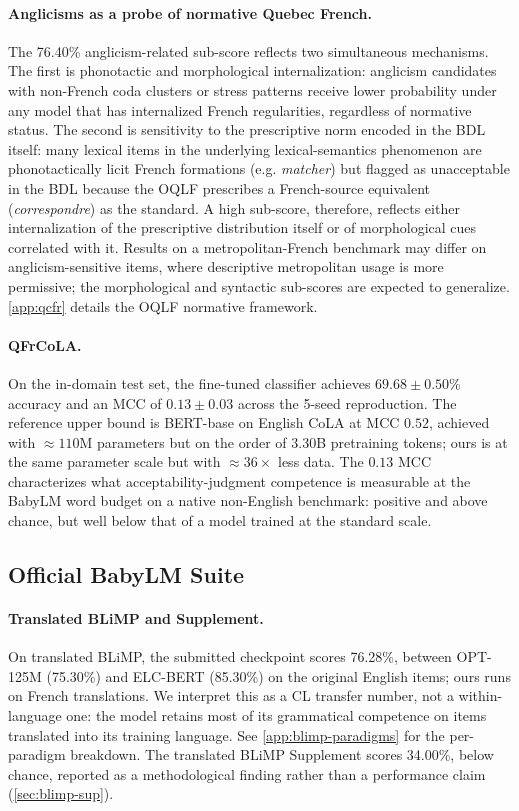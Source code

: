 \documentclass[11pt]{article}
\begin{document}
\paragraph{Anglicisms as a probe of normative Quebec French.}
The 76.40\% anglicism-related sub-score reflects two simultaneous mechanisms. The first is phonotactic and morphological internalization: anglicism candidates with non-French coda clusters or stress patterns receive lower probability under any model that has internalized French regularities, regardless of normative status. 
The second is sensitivity to the prescriptive norm encoded in the BDL itself: many lexical items in the underlying lexical-semantics phenomenon are phonotactically licit French formations (e.g. \emph{matcher}) but flagged as unacceptable in the BDL because the OQLF prescribes a French-source equivalent (\emph{correspondre}) as the standard. A high sub-score, therefore, reflects either internalization of the prescriptive distribution itself or of morphological cues correlated with it. Results on a metropolitan-French benchmark may differ on anglicism-sensitive items, where descriptive metropolitan usage is more permissive; the morphological and syntactic sub-scores are expected to generalize. \autoref{app:qcfr} details the OQLF normative framework.

\paragraph{QFrCoLA.}
On the in-domain test set, the fine-tuned classifier achieves $69.68 \pm 0.50$\% accuracy and an MCC of $0.13 \pm 0.03$ across the 5-seed reproduction. The reference upper bound is BERT-base on English CoLA at MCC $0.52$, achieved with $\approx\!110$M parameters but on the order of 3.30B pretraining tokens; ours is at the same parameter scale but with $\approx\!36\times$ less data. The $0.13$ MCC characterizes what acceptability-judgment competence is measurable at the BabyLM word budget on a native non-English benchmark: positive and above chance, but well below that of a model trained at the standard scale.

\subsection{Official BabyLM Suite}
\label{sec:results-official}

\paragraph{Translated BLiMP and Supplement.}
On translated BLiMP, the submitted checkpoint scores 76.28\%, between OPT-125M (75.30\%) and ELC-BERT (85.30\%) \citep{charpentier2023elcbert} on the original English items; ours runs on French translations. We interpret this as a CL transfer number, not a within-language one: the model retains most of its grammatical competence on items translated into its training language. See \autoref{app:blimp-paradigms} for the per-paradigm breakdown. 
The translated BLiMP Supplement scores 34.00\%, below chance, reported as a methodological finding rather than a performance claim (\autoref{sec:blimp-sup}). 
\end{document}
